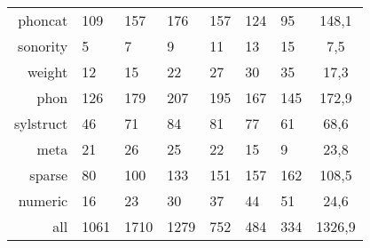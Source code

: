 \begin{longtable}{|r|llllll|c|}
    phoncat           & 109  & 157  & 176  & 157  & 124  & 95   & 148,1    \\
    sonority          & 5    & 7    & 9    & 11   & 13   & 15   & 7,5      \\
    weight            & 12   & 15   & 22   & 27   & 30   & 35   & 17,3     \\
    phon              & 126  & 179  & 207  & 195  & 167  & 145  & 172,9    \\
    sylstruct         & 46   & 71   & 84   & 81   & 77   & 61   & 68,6     \\
    meta              & 21   & 26   & 25   & 22   & 15   & 9    & 23,8     \\
    sparse            & 80   & 100  & 133  & 151  & 157  & 162  & 108,5    \\
    numeric           & 16   & 23   & 30   & 37   & 44   & 51   & 24,6     \\
    all               & 1061 & 1710 & 1279 & 752  & 484  & 334  & 1326,9   \\ \hline
\end{longtable}
\normalsize